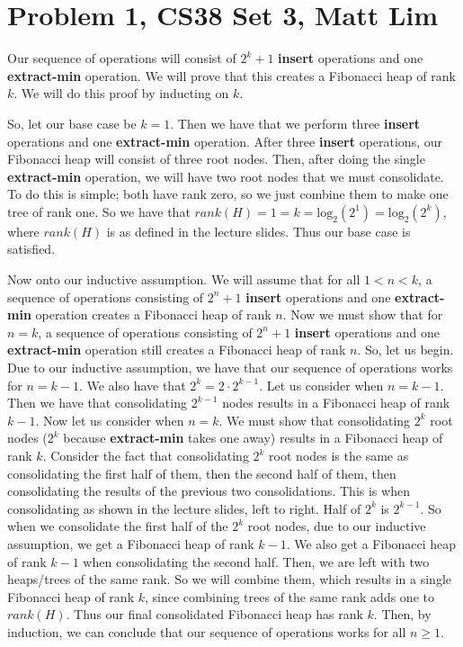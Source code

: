 \documentclass{article}
\begin{document}
\section*{Problem 1, CS38 Set 3, Matt Lim}
Our sequence of operations will consist of
$2^k + 1$ \textbf{insert} operations and one \textbf{extract-min} operation.
We will prove that this creates a Fibonacci heap of rank $k$. We will do this
proof by inducting on $k$.

So, let our base case be $k = 1$. Then we have that we perform three \textbf{insert}
operations and one \textbf{extract-min} operation. After three \textbf{insert}
operations, our Fibonacci heap will consist of three root nodes. Then, after doing
the single \textbf{extract-min} operation, we will have two root nodes that we
must consolidate. To do this is simple; both have rank zero, so we just combine
them to make one tree of rank one. So we have that $rank(H) = 1 = k =
\text{log}_2(2^1) = \text{log}_2(2^k)$, where $rank(H)$ is as defined in the
lecture slides. Thus our base case is satisfied.

Now onto our inductive assumption. We will assume that for all $1 < n < k$,
a sequence of operations consisting of $2^n + 1$ \textbf{insert} operations and
one \textbf{extract-min} operation creates a Fibonacci heap of rank $n$. Now we
must show that for $n = k$, a sequence of operations consisting of $2^n + 1$
\textbf{insert} operations and one \textbf{extract-min} operation still creates a
Fibonacci heap of rank $n$. So, let us begin. Due to our inductive assumption,
we have that our sequence of operations works for $n = k-1$. We also have that
$2^k = 2 \cdot 2^{k-1}$. Let us consider when $n = k - 1$. Then we have that
consolidating $2^{k-1}$ nodes results in a Fibonacci heap of rank $k - 1$.
Now let us consider when $n = k$. We must show that consolidating $2^k$ root
nodes ($2^k$ because \textbf{extract-min} takes one away) results in a Fibonacci
heap of rank $k$. Consider the fact that consolidating $2^k$ root nodes is the
same as consolidating the first half of them, then the second half of them, then
consolidating the results of the previous two consolidations. This is when
consolidating as shown in the lecture slides, left to right. Half of $2^k$ is
$2^{k-1}$. So when we consolidate the first half of the $2^k$ root nodes, due to
our inductive assumption, we get a Fibonacci heap of rank $k-1$. We also get a
Fibonacci heap of rank $k-1$ when consolidating the second half. Then, we are
left with two heaps/trees of the same rank. So we will combine them, which
results in a single Fibonacci heap of rank $k$, since combining trees of the
same rank adds one to $rank(H)$. Thus our final consolidated Fibonacci heap has
rank $k$. Then, by induction, we can conclude that our sequence of operations
works for all $n \ge 1$.
\newpage
\end{document}
